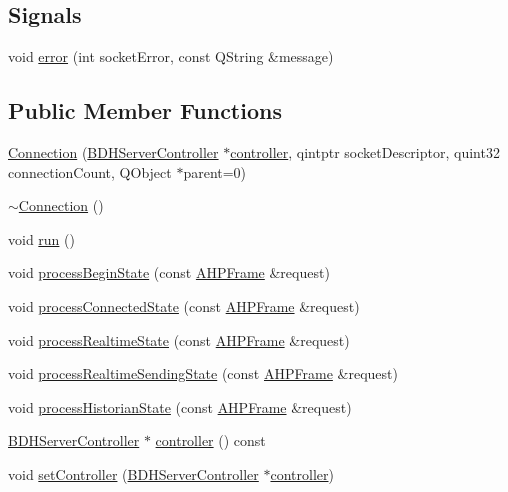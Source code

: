 \subsection*{Signals}
\begin{DoxyCompactItemize}
\item 
void \hyperlink{class_a_h_p_1_1_connection_a694f82f2174a0c8d733421409f3877a1}{error} (int socket\+Error, const Q\+String \&message)
\end{DoxyCompactItemize}
\subsection*{Public Member Functions}
\begin{DoxyCompactItemize}
\item 
\hyperlink{class_a_h_p_1_1_connection_a35fb53431e6c52e6d939995ad1863bb0}{Connection} (\hyperlink{class_b_d_h_server_controller}{B\+D\+H\+Server\+Controller} $\ast$\hyperlink{class_a_h_p_1_1_connection_a0372fbaa9cd2c56a64e5aa357bc6afe1}{controller}, qintptr socket\+Descriptor, quint32 connection\+Count, Q\+Object $\ast$parent=0)
\item 
\hyperlink{class_a_h_p_1_1_connection_ad48fbbd9743278ded4cd27e988e861c7}{$\sim$\+Connection} ()
\item 
void \hyperlink{class_a_h_p_1_1_connection_af2d00d3660f9b423d34406a8ffefdef8}{run} ()
\item 
void \hyperlink{class_a_h_p_1_1_connection_aa2f447c89587214efd59a4fd5ebcb127}{process\+Begin\+State} (const \hyperlink{class_a_h_p_1_1_a_h_p_frame}{A\+H\+P\+Frame} \&request)
\item 
void \hyperlink{class_a_h_p_1_1_connection_a976769ffcd832147f3a4efa500f0fe3a}{process\+Connected\+State} (const \hyperlink{class_a_h_p_1_1_a_h_p_frame}{A\+H\+P\+Frame} \&request)
\item 
void \hyperlink{class_a_h_p_1_1_connection_acf1ff78a54a3237758c03de5cc3e4ef2}{process\+Realtime\+State} (const \hyperlink{class_a_h_p_1_1_a_h_p_frame}{A\+H\+P\+Frame} \&request)
\item 
void \hyperlink{class_a_h_p_1_1_connection_a64006ff6d9e87505bbc7cf7c9e8b8b6b}{process\+Realtime\+Sending\+State} (const \hyperlink{class_a_h_p_1_1_a_h_p_frame}{A\+H\+P\+Frame} \&request)
\item 
void \hyperlink{class_a_h_p_1_1_connection_a93b50496d66aa6c1a1538867be267528}{process\+Historian\+State} (const \hyperlink{class_a_h_p_1_1_a_h_p_frame}{A\+H\+P\+Frame} \&request)
\item 
\hyperlink{class_b_d_h_server_controller}{B\+D\+H\+Server\+Controller} $\ast$ \hyperlink{class_a_h_p_1_1_connection_a0372fbaa9cd2c56a64e5aa357bc6afe1}{controller} () const 
\item 
void \hyperlink{class_a_h_p_1_1_connection_a558e8770bf08b419280e6abba6c72f69}{set\+Controller} (\hyperlink{class_b_d_h_server_controller}{B\+D\+H\+Server\+Controller} $\ast$\hyperlink{class_a_h_p_1_1_connection_a0372fbaa9cd2c56a64e5aa357bc6afe1}{controller})
\end{DoxyCompactItemize}


